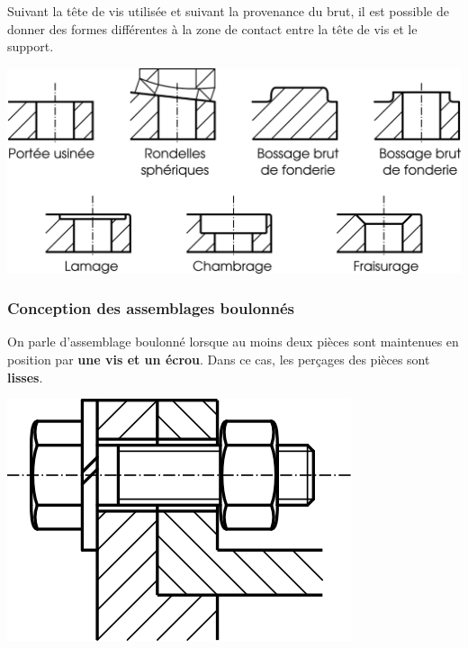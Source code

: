 \documentclass[11pt,oneside]{article}
\begin{document}
\vspace{.5cm}

Suivant la tête de vis utilisée et suivant la provenance du brut, il est possible de donner des formes différentes à la zone de contact entre la tête de vis et le support. 

\begin{center}
\includegraphics[width=.7\textwidth]{png/portees}
\end{center}



\subsubsection{Conception des assemblages boulonnés}

On parle d'assemblage boulonné lorsque au moins deux pièces sont maintenues en position par \textbf{une vis et un écrou}. Dans ce cas, les perçages des pièces sont \textbf{lisses}.

\begin{center}
\includegraphics[width=.3\textwidth]{png/Fig30_7}

\end{center}
\end{document}
